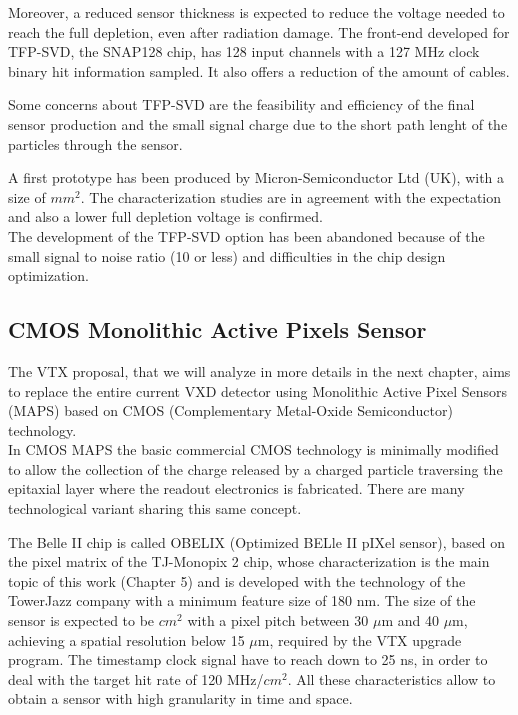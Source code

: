 Moreover, a reduced sensor thickness is expected to reduce the voltage needed to reach the full depletion, even after radiation damage. 
The front-end developed for TFP-SVD, the SNAP128 chip, has 128 input channels with a 127 MHz clock binary hit information sampled. It also offers a reduction of the amount of cables.

Some concerns about TFP-SVD are the feasibility and efficiency of the final sensor production and the small signal charge due to the short path lenght of the particles through the sensor.

A first prototype has been produced by Micron-Semiconductor Ltd (UK), with a size of  $mm^{2}$. The characterization studies are in agreement with the expectation and also a lower full depletion voltage is confirmed. \\
The development of the TFP-SVD option has been abandoned because of the small signal to noise ratio (10 or less) and difficulties in the chip design optimization.


\subsection{CMOS Monolithic Active Pixels Sensor}

The VTX proposal, that we will analyze in more details in the next chapter, aims to replace the entire current VXD detector using Monolithic Active Pixel Sensors (MAPS) based on CMOS (Complementary Metal-Oxide Semiconductor) technology. \\
In CMOS MAPS the basic commercial CMOS technology is minimally modified to allow the collection of the charge released by a charged particle traversing the epitaxial layer where the readout electronics is fabricated. There are many technological variant sharing this same concept.

\begin{comment}
The program hopes to solve some of the issues discussed in the previous chapters, with a new system of two inner layers and three outermost, for a total of 5 stages equipped with a single sensro type, called \textbf{VTX} (layout in~\autoref{fig:VTX_layout}). Also the mechanical structure has been redesigned but it is expected that the all system could work at room temperature, so as consequence an important reduction of services is also contemplated.\\
\end{comment}

The Belle II chip is called OBELIX (Optimized BELle II pIXel sensor), based on the pixel matrix of the TJ-Monopix 2 chip, whose characterization is the main topic of this work (Chapter 5) and is developed with the technology of the TowerJazz company with a minimum feature size of 180 nm. 
The size of the sensor is expected to be  $cm^{2}$ with a pixel pitch between 30 $\mu$m and 40 $\mu$m, achieving a spatial resolution below 15 $\mu$m, required by the VTX upgrade program. The timestamp clock signal have to reach down to 25 ns, in order to deal with the target hit rate of 120 MHz/$cm^{2}$. All these characteristics allow to obtain a sensor with high granularity in time and space.

